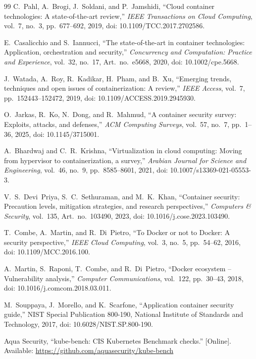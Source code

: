 \begin{thebibliography}{99}
 C.~Pahl, A.~Brogi, J.~Soldani, and P.~Jamshidi, ``Cloud container technologies: A state-of-the-art review,'' \emph{IEEE Transactions on Cloud Computing}, vol.~7, no.~3, pp.~677--692, 2019, doi: 10.1109/TCC.2017.2702586.

 E.~Casalicchio and S.~Iannucci, ``The state-of-the-art in container technologies: Application, orchestration and security,'' \emph{Concurrency and Computation: Practice and Experience}, vol.~32, no.~17, Art.~no.~e5668, 2020, doi: 10.1002/cpe.5668.

 J.~Watada, A.~Roy, R.~Kadikar, H.~Pham, and B.~Xu, ``Emerging trends, techniques and open issues of containerization: A review,'' \emph{IEEE Access}, vol.~7, pp.~152443--152472, 2019, doi: 10.1109/ACCESS.2019.2945930.

 O.~Jarkas, R.~Ko, N.~Dong, and R.~Mahmud, ``A container security survey: Exploits, attacks, and defenses,'' \emph{ACM Computing Surveys}, vol.~57, no.~7, pp.~1--36, 2025, doi: 10.1145/3715001.

 A.~Bhardwaj and C.~R.~Krishna, ``Virtualization in cloud computing: Moving from hypervisor to containerization, a survey,'' \emph{Arabian Journal for Science and Engineering}, vol.~46, no.~9, pp.~8585--8601, 2021, doi: 10.1007/s13369-021-05553-3.

 V.~S.~Devi~Priya, S.~C.~Sethuraman, and M.~K.~Khan, ``Container security: Precaution levels, mitigation strategies, and research perspectives,'' \emph{Computers \& Security}, vol.~135, Art.~no.~103490, 2023, doi: 10.1016/j.cose.2023.103490.

 T.~Combe, A.~Martin, and R.~Di~Pietro, ``To Docker or not to Docker: A security perspective,'' \emph{IEEE Cloud Computing}, vol.~3, no.~5, pp.~54--62, 2016, doi: 10.1109/MCC.2016.100.

 A.~Martin, S.~Raponi, T.~Combe, and R.~Di~Pietro, ``Docker ecosystem -- Vulnerability analysis,'' \emph{Computer Communications}, vol.~122, pp.~30--43, 2018, doi: 10.1016/j.comcom.2018.03.011.

 M.~Souppaya, J.~Morello, and K.~Scarfone, ``Application container security guide,'' NIST Special Publication 800-190, National Institute of Standards and Technology, 2017, doi: 10.6028/NIST.SP.800-190.

 Aqua Security, ``kube-bench: CIS Kubernetes Benchmark checks.'' [Online]. Available: \url{https://github.com/aquasecurity/kube-bench}


\end{thebibliography}
